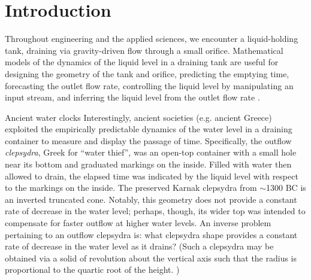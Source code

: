 \documentclass[openacc]{rsproca_new}%
\begin{document}
\rsbreak


\section{Introduction}
Throughout engineering and the applied sciences, we encounter a liquid-holding tank, draining via gravity-driven flow through a small orifice.
Mathematical models of the dynamics of the liquid level in a draining tank are useful for designing the geometry of the tank and orifice, predicting the emptying time, forecasting the outlet flow rate, controlling the liquid level by manipulating an input stream, and inferring the liquid level from the outlet flow rate \cite{d2021torricelli,seborg2016process,groetsch1993inverse,groetsch1999inverse}.

\begin{mytcbox}[label=box:waterclocks, breakable]{Ancient water clocks}
Interestingly, ancient societies (e.g. ancient Greece) exploited the empirically predictable dynamics of the water level in a draining container to measure and display the passage of time.
Specifically, the outflow \emph{clepsydra}, Greek for ``water thief'', was an open-top container with a small hole near its bottom and graduated markings on the inside. 
Filled with water then allowed to drain, the elapsed time was indicated by the liquid level with respect to the markings on the inside. \cite{bedini1962compartmented,hwang2021historical,ritner2016oriental,hejun1987research,schomberg2018karnak,mills1982newton}
The preserved Karnak clepsydra from $\sim$1300 BC \cite{schomberg2018karnak} is an inverted truncated cone. Notably, this geometry does not provide a constant rate of decrease in the water level; perhaps, though, its wider top was intended to compensate for faster outflow at higher water levels. An inverse problem pertaining to an outflow clepsydra is: what clepsydra shape provides a constant rate of decrease in the water level as it drains?
(Such a clepsydra may be obtained via a solid of revolution about the vertical axis such that the radius is proportional to the quartic root of the height. \cite{mills1982newton,d2021torricelli})
\end{mytcbox}
\end{document}
